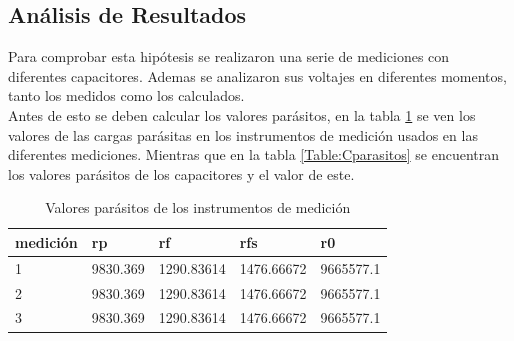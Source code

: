 \documentclass[journal]{IEEEtran}
\begin{document}
 \subsection{Análisis de Resultados}
 Para comprobar esta hipótesis se realizaron una serie de mediciones con diferentes capacitores. Ademas se analizaron sus voltajes en diferentes momentos, tanto los medidos como los calculados.\\ Antes de esto se deben calcular los valores parásitos, en la tabla \ref{Table:Imedicion} se ven los valores de las  cargas parásitas en los instrumentos de medición usados en las diferentes mediciones. Mientras que en la tabla \ref{Table:Cparasitos} se encuentran los valores parásitos de los capacitores y el valor de este.
 \begin{table}[]
 	\centering
 	\caption{Valores parásitos de los instrumentos de medición}
 	\label{Table:Imedicion}
 	\begin{tabular}{lllll}
 	\hline
 	\multicolumn{1}{|l|}{medición} & \multicolumn{1}{l|}{rp} & 
 	\multicolumn{1}{l|}{rf} & 
 	\multicolumn{1}{l|}{rfs} & 
 	\multicolumn{1}{l|}{r0} \\ \hline
 	\multicolumn{1}{|l|}{1}        & \multicolumn{1}{l|}{9830.369}            & \multicolumn{1}{l|}{1290.83614}             & \multicolumn{1}{l|}{1476.66672}                      & \multicolumn{1}{l|}{9665577.1}                   \\ \hline
 	\multicolumn{1}{|l|}{2}        & \multicolumn{1}{l|}{9830.369}            & \multicolumn{1}{l|}{1290.83614}             & \multicolumn{1}{l|}{1476.66672}                      & \multicolumn{1}{l|}{9665577.1}                            \\ \hline
 	\multicolumn{1}{|l|}{3}       & \multicolumn{1}{l|}{9830.369}            & \multicolumn{1}{l|}{1290.83614}             & \multicolumn{1}{l|}{1476.66672}                      & \multicolumn{1}{l|}{9665577.1}  
 	\\ \hline
 \end{tabular}
\end{table}
\end{document}

